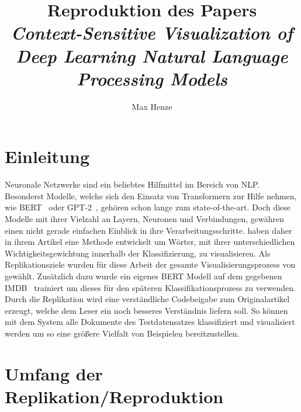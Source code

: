 \documentclass[DIV=13,fontsize=11pt]{scrartcl}
\begin{document}
\subject{Projektbericht zum Modul Data Mining Wintersemester 20221/2022}
\title{Reproduktion des Papers \\ \textit{Context-Sensitive Visualization of Deep Learning Natural Language Processing Models}\cite{dunn2021context}}
\author{Max Henze}%
\maketitle%

\section{Einleitung}

Neuronale Netzwerke sind ein beliebtes Hilfmittel im Bereich von NLP.
Besonderst Modelle, welche sich den Einsatz von Transformern zur Hilfe nehmen,
wie BERT~\cite{devlin2018bert} oder GPT-2~\cite{radford2019language},
gehören schon lange zum state-of-the-art. Doch diese Modelle mit ihrer
Vielzahl an Layern, Neuronen und Verbindungen, gewähren einen nicht
gerade einfachen Einblick in ihre Verarbeitungsschritte.
\citeauthor{dunn2021context} haben daher in ihrem Artikel 
eine Methode entwickelt um Wörter, mit ihrer unterschiedlichen Wichtigkeitsgewichtung
innerhalb der Klassifizierung, zu visualisieren.
Als Replikationsziele wurden für diese Arbeit der gesamte Visualisierungsprozess
von \citeauthor{dunn2021context} gewählt. Zusätzlich dazu wurde ein eigenes
BERT Modell auf dem gegebenen IMDB~\cite{maas-EtAl:2011:ACL-HLT2011} trainiert um
dieses für den späteren Klassifikationsprozess zu verwenden.
Durch die Replikation wird eine verständliche Codebeigabe zum Originalartikel
erzeugt, welche dem Leser ein noch besseres Verständnis liefern soll. So können
mit dem System alle Dokumente des Testdatensatzes klassifiziert und visualisiert werden
um so eine größere Vielfalt von Beispielen bereitzustellen.

\section{Umfang der Replikation/Reproduktion}
\end{document}
